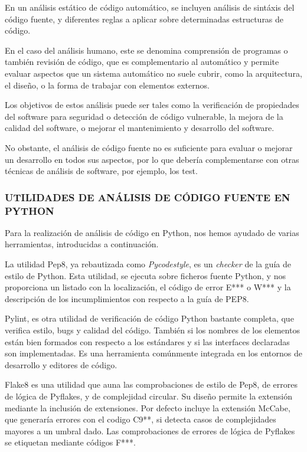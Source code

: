 En un análisis estático de código automático, se incluyen análisis de sintáxis del código fuente, y diferentes reglas a aplicar sobre determinadas estructuras de código.


En el caso del análisis humano, este se denomina comprensión de programas o también revisión de código, que es complementario al automático y permite evaluar aspectos que un sistema automático no suele cubrir, como la arquitectura, el diseño, o la forma de trabajar con elementos externos.


Los objetivos de estos análisis puede ser tales como la verificación de propiedades del software para seguridad o detección de código vulnerable, la mejora de la calidad del software, o mejorar el mantenimiento y desarrollo del software.


No obstante, el análisis de código fuente no es suficiente para evaluar o mejorar un desarrollo en todos sus aspectos, por lo que debería complementarse con otras técnicas de análisis de software, por ejemplo, los test.


\subsubsection{UTILIDADES DE ANÁLISIS DE CÓDIGO FUENTE EN PYTHON} 
\label{sec:utilidades_cod}


Para la realización de análisis de código en Python, nos hemos ayudado de varias herramientas, introducidas a continuación.


La utilidad Pep8, ya rebautizada como \textit{Pycodestyle}, es un \textit{checker} de la guía de estilo de Python. Esta utilidad, se ejecuta sobre ficheros fuente Python, y nos proporciona un listado con la localización, el código de error E*** o W*** y la descripción de los incumplimientos con respecto a la guía de PEP8.


Pylint, es otra utilidad de verificación de código Python bastante completa, que verifica estilo, bugs y calidad del código. También si los nombres de los elementos están bien formados con respecto a los estándares y si las interfaces declaradas son implementadas. Es una herramienta comúnmente integrada en los entornos de desarrollo y editores de código.


Flake8 es una utilidad que auna las comprobaciones de estilo de Pep8, de errores de lógica de Pyflakes, y de complejidad circular. Su diseño permite la extensión mediante la inclusión de extensiones. Por defecto incluye la extensión McCabe, que generaría errores con el codigo C9**, si detecta casos de complejidades mayores a un umbral dado. Las comprobaciones de errores de lógica de Pyflakes se etiquetan mediante códigos F***.


